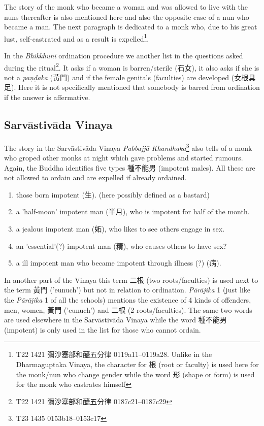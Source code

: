 The story of the monk who became a woman and was allowed to live with the nuns thereafter is also mentioned here and also the opposite case of a nun who became a man. The next paragraph is dedicated to a monk who, due to his great lust, self-castrated and as a result is expelled\footnote{T22 1421 彌沙塞部和醯五分律 0119a11–0119a28. Unlike in the Dharmaguptaka Vinaya, the character for 根 (root or faculty) is used here for the monk/nun who change gender while the word 形 (shape or form) is used for the monk who castrates himself}. 

In the {\em Bhikkhunī} ordination procedure we another list in the questions asked during the ritual\footnote{T22 1421 彌沙塞部和醯五分律 0187c21–0187c29}. It asks if a woman is barren/sterile (石女), it also asks if she is not a {\em paṇḍaka} (黃門) and if the female genitals (faculties) are developed (女根具足). Here it is not specifically mentioned that somebody is barred from ordination if the answer is affermative.

\subsection{Sarvāstivāda Vinaya}
The story in the Sarvāstivāda Vinaya {\em Pabbajjā Khandhaka}\footnote{T23 1435 0153b18–0153c17} also tells of a monk who groped other monks at night which gave problems and started rumours. Again, the Buddha identifies five types 種不能男 (impotent males). All these are not allowed to ordain and are expelled if already ordained.

\begin{enumerate}
\item those born impotent (生). (here possibly defined as a bastard)
\item a 'half-moon' impotent man (半月), who is impotent for half of the month.
\item a jealous impotent man (妬), who likes to see others engage in sex.
\item an 'essential'(?) impotent man (精), who causes others to have sex?
\item a ill impotent man who became impotent through illness (?) (病).
\end{enumerate}

In another part of the Vinaya this term 二根 (two roots/faculties) is used next to the term 黃門 ('eunuch') but not in relation to ordination. {\em Pārājika} 1 (just like the {\em Pārājika} 1 of all the schools) mentions the existence of 4 kinds of offenders, men, women, 黃門 ('eunuch') and 二根 (2 roots/faculties). The same two words are used elsewhere in the Sarvāstivāda Vinaya while the word 種不能男 (impotent) is only used in the list for those who cannot ordain.

